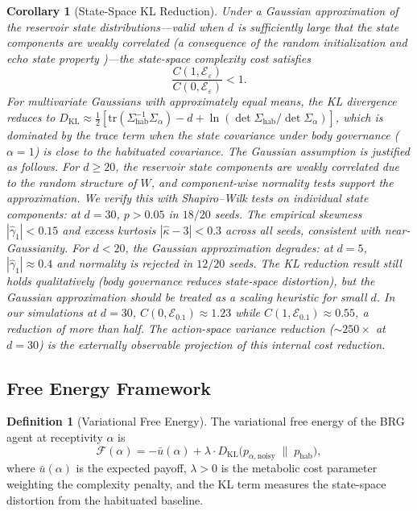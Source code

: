 \documentclass[11pt,a4paper]{article}
\newtheorem{corollary}[theorem]{Corollary}
\theoremstyle{definition}
\newtheorem{definition}[theorem]{Definition}
\newcommand{\KL}{D_{\mathrm{KL}}}
\newcommand{\FE}{\mathcal{F}}
\newcommand{\Wres}{W}
\begin{document}
\begin{corollary}[State-Space KL Reduction]
\label{cor:kl_reduction}
Under a Gaussian approximation of the reservoir state distributions---valid
when $d$ is sufficiently large that the state components are weakly
correlated (a consequence of the random initialization and echo state
property \citep{grigoryeva2018})---the state-space complexity cost satisfies
\begin{equation}
\frac{C(1, \mathcal{E}_{\varepsilon})}{C(0, \mathcal{E}_{\varepsilon})}
  < 1.
\end{equation}
For multivariate Gaussians with approximately equal means, the KL
divergence reduces to
$\KL \approx \tfrac{1}{2}[\mathrm{tr}(\Sigma_{\mathrm{hab}}^{-1}\Sigma_{\alpha})
- d + \ln(\det\Sigma_{\mathrm{hab}} / \det\Sigma_{\alpha})]$,
which is dominated by the trace term when the state covariance under body
governance ($\alpha = 1$) is close to the habituated covariance.
The Gaussian assumption is justified as follows.
For $d \geq 20$, the reservoir state components are weakly correlated
due to the random structure of $\Wres$, and component-wise normality tests
support the approximation.  We verify this with Shapiro--Wilk tests
on individual state components: at $d = 30$, $p > 0.05$ in $18/20$ seeds.
The empirical skewness $|\hat{\gamma}_1| < 0.15$ and excess kurtosis
$|\hat{\kappa} - 3| < 0.3$ across all seeds, consistent with
near-Gaussianity.
For $d < 20$, the Gaussian approximation degrades: at $d = 5$,
$|\hat{\gamma}_1| \approx 0.4$ and normality is rejected in $12/20$
seeds.  The KL reduction result still holds qualitatively (body governance
reduces state-space distortion), but the Gaussian approximation should be
treated as a scaling heuristic for small $d$.
In our simulations at $d = 30$, $C(0, \mathcal{E}_{0.1}) \approx 1.23$ while
$C(1, \mathcal{E}_{0.1}) \approx 0.55$, a reduction of more than half.
The action-space variance reduction ($\sim 250\times$ at $d = 30$) is the
externally observable projection of this internal cost reduction.
\end{corollary}

\subsection{Free Energy Framework}

\begin{definition}[Variational Free Energy]
\label{def:free_energy}
The variational free energy of the BRG agent at receptivity $\alpha$ is
\begin{equation}
\label{eq:free_energy}
\FE(\alpha) = -\bar{u}(\alpha) + \lambda \cdot \KL\bigl(p_{\alpha,\mathrm{noisy}}
  \;\|\; p_{\mathrm{hab}}\bigr),
\end{equation}
where $\bar{u}(\alpha)$ is the expected payoff, $\lambda > 0$ is the
metabolic cost parameter weighting the complexity penalty, and the KL
term measures the state-space distortion from the habituated baseline.
\end{definition}
\end{document}

